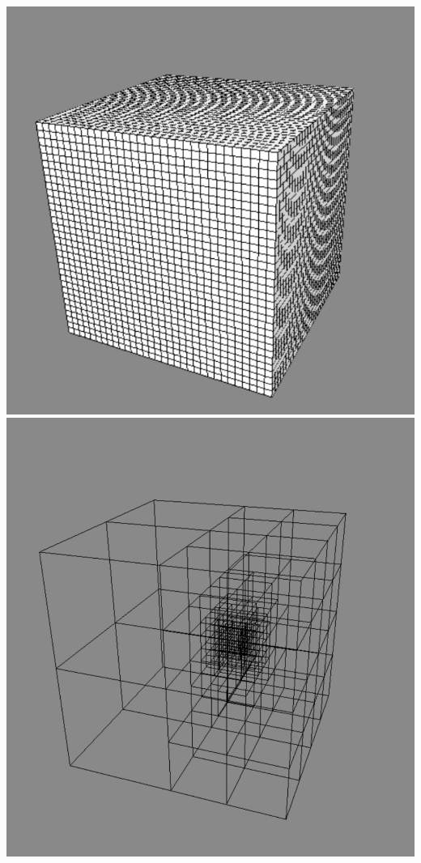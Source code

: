 \begin{frame}
\begin{columns}
\end{columns}
\ \\
\centering
\includegraphics[scale=0.2]{figures/unifgrid.pdf}
\includegraphics[scale=0.1192]{figures/adapgrid.pdf}
\end{frame}
